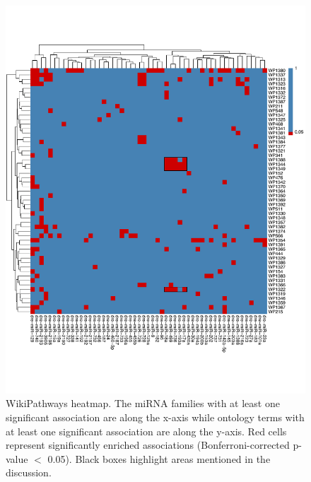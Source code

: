 \documentclass[12pt]{article}
\begin{document}
\begin{figure}[]
\includegraphics[width=\textwidth]{figures/heatmap.pdf}
\caption[WikiPathways Heatmap]{WikiPathways heatmap. The miRNA families with at least one significant association are along the x-axis while ontology terms with at least one significant association are along the y-axis. Red cells represent significantly enriched associations (Bonferroni-corrected p-value $<$ 0.05). Black boxes highlight areas mentioned in the discussion.}
\centering
\label{4}
\end{figure}


\end{document}
